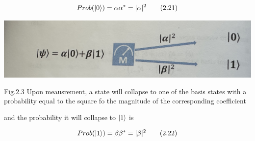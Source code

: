 \documentclass{article}
\begin{document}
\begin{equation}
Prob(\ket{0})=\alpha\alpha^* = |\alpha| ^2 \tag{2.21}
\end{equation}

  
    

\includegraphics[scale=0.35, angle=0]{Fig.2.3.jpeg}

Fig.2.3 Upon meausrement, a state will collapse to one of the basis states with a probability equal to the square fo the magnitude of the corresponding coefficient

and the probability it will collapse to $\ket{1}$ is

\begin{equation}
 Prob(\ket{1})=\beta\beta^* = |\beta| ^2   \tag{2.22}
\end{equation}
\end{document}
